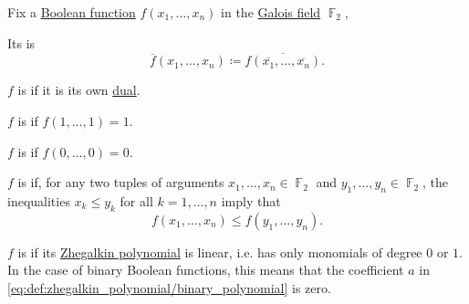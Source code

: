 \begin{definition}\label{def:boolean_functions_in_f2}
  Fix a \hyperref[def:boolean_function]{Boolean function} \( f(x_1, \ldots, x_n) \) in the \hyperref[thm:galois_field_existence]{Galois field} \( \BbbF_2 \),

  \begin{thmenum}
     Its  is
    \begin{equation*}
      \overline{f}(x_1, \ldots, x_n) \coloneqq \overline{f(\overline{x_1}, \ldots, \overline{x_n})}.
    \end{equation*}

     \( f \) is  if it is its own \hyperref[def:boolean_function_in_f2/dual]{dual}.

     \( f \) is  if \( f(1, \ldots, 1) = 1 \).

     \( f \) is  if \( f(0, \ldots, 0) = 0 \).

     \( f \) is  if, for any two tuples of arguments \( x_1, \ldots, x_n \in \BbbF_2 \) and \( y_1, \ldots, y_n \in \BbbF_2 \), the inequalities \( x_k \leq y_k \) for all \( k = 1, \ldots, n \) imply that
    \begin{equation*}
      f(x_1, \ldots, x_n) \leq f(y_1, \ldots, y_n).
    \end{equation*}

     \( f \) is  if its \hyperref[def:zhegalkin_polynomial]{Zhegalkin polynomial} is linear, i.e. has only monomials of degree \( 0 \) or \( 1 \). In the case of binary Boolean functions, this means that the coefficient \( a \) in \eqref{eq:def:zhegalkin_polynomial/binary_polynomial} is zero.
  \end{thmenum}
\end{definition}

